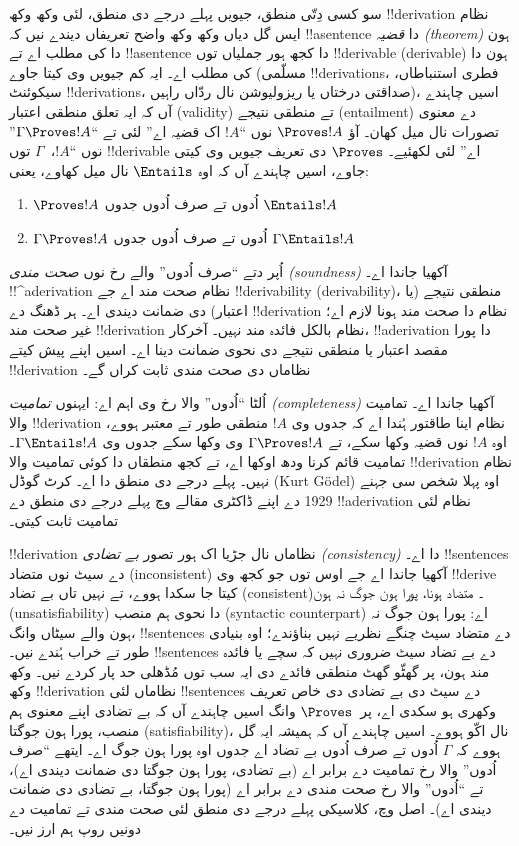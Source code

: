 \documentclass[../../../include/open-logic-section]{subfiles}
\begin{document}
سو کسی دِتّی منطق، جیویں پہلے درجے دی منطق، لئی وکھ وکھ
!!{derivation} نظام ایس گل دیاں وکھ وکھ واضح تعریفاں دیندے نیں کہ
!!a{sentence} دا \emph{قضیہ (theorem)} ہون دا کی مطلب اے تے !!a{sentence} دا
کجھ ہور جملیاں توں !!{derivable} (derivable) ہون دا کی مطلب اے۔ ایہ کم جیویں وی
کیتا جاوے (مسلّمی !!{derivation}s، فطری استنباطاں، سیکوئنٹ
!!{derivation}s، صداقتی درختاں یا ریزولیوشن نال ردّاں راہیں)، اسیں
چاہندے آں کہ ایہ تعلق منطقی اعتبار (validity) تے منطقی نتیجے
(entailment) دے معنوی تصورات نال
میل کھان۔ آؤ $\Proves !A$ نوں ``$!A$ اک قضیہ اے'' لئی تے
``$\Gamma \Proves !A$'' نوں ``$!A$،~$\Gamma$ توں !!{derivable} اے''
لئی لکھئیے۔ $\Proves$ دی تعریف جیویں وی کیتی جاوے، اسیں چاہندے آں کہ
اوہ $\Entails$ نال میل کھاوے، یعنی:
\begin{enumerate}
\item $\Proves !A$ اُدوں تے صرف اُدوں جدوں $\Entails !A$
\item $\Gamma \Proves !A$ اُدوں تے صرف اُدوں جدوں $\Gamma \Entails !A$
\end{enumerate}
اُپر دتے ``صرف اُدوں'' والے رخ نوں \emph{صحت مندی (soundness)} آکھیا جاندا اے۔
!!^a{derivation} نظام صحت مند اے جے !!{derivability} (derivability)، منطقی نتیجے (یا
اعتبار) دی ضمانت دیندی اے۔ ہر ڈھنگ دے !!{derivation} نظام دا صحت مند
ہونا لازم اے؛ غیر صحت مند !!{derivation} نظام بالکل فائدہ مند نہیں۔
آخرکار، !!a{derivation} دا پورا مقصد اعتبار یا منطقی نتیجے دی نحوی
ضمانت دینا اے۔ اسیں اپنے پیش کیتے !!{derivation} نظاماں دی صحت مندی
ثابت کراں گے۔

اُلٹا ``اُدوں'' والا رخ وی اہم اے: ایہنوں \emph{تمامیت (completeness)} آکھیا جاندا
اے۔ تمامیت والا !!{derivation} نظام اینا طاقتور ہُندا اے کہ جدوں وی $!A$
منطقی طور تے معتبر ہووے، اوہ $!A$ نوں قضیہ وکھا سکے، تے
$\Gamma \Proves !A$ وی وکھا سکے جدوں وی $\Gamma \Entails !A$۔ تمامیت
قائم کرنا ودھ اوکھا اے، تے کجھ منطقاں دا کوئی تمامیت والا !!{derivation} نظام
نہیں۔ پہلے درجے دی منطق دا اے۔ کرٹ گوڈل (Kurt Gödel) اوہ پہلا شخص سی جہنے 1929 دے
اپنے ڈاکٹری مقالے وچ پہلے درجے دی منطق دے !!a{derivation} نظام لئی
تمامیت ثابت کیتی۔

!!{derivation} نظاماں نال جڑیا اک ہور تصور \emph{بے تضادی (consistency)} دا اے۔
!!{sentence}s دے سیٹ نوں متضاد (inconsistent) آکھیا جاندا اے جے اوس توں
جو کجھ وی !!{derive} کیتا جا سکدا ہووے، تے نہیں تاں بے تضاد (consistent)۔
متضاد ہونا، پورا ہون جوگ نہ ہون (unsatisfiability) دا نحوی ہم منصب
(syntactic counterpart) اے: پورا ہون جوگ نہ ہون والے سیٹاں
وانگ، !!{sentence}s دے متضاد سیٹ چنگے نظریے نہیں بناؤندے؛ اوہ بنیادی
طور تے خراب ہُندے نیں۔ !!{sentence}s دے بے تضاد سیٹ ضروری نہیں کہ سچے
یا فائدہ مند ہون، پر گھٹّو گھٹ منطقی فائدے دی ایہ سب توں مُڈھلی حد
پار کردے نیں۔ وکھ وکھ !!{derivation} نظاماں لئی !!{sentence}s دے سیٹ
دی بے تضادی دی خاص تعریف وکھری ہو سکدی اے، پر~$\Proves$ وانگ اسیں
چاہندے آں کہ بے تضادی اپنے معنوی ہم منصب، پورا ہون جوگتا
(satisfiability)، نال اکّو
ہووے۔ اسیں چاہندے آں کہ ہمیشہ ایہ گل ہووے کہ $\Gamma$ اُدوں تے صرف
اُدوں بے تضاد اے جدوں اوہ پورا ہون جوگ اے۔ ایتھے ``صرف اُدوں'' والا
رخ تمامیت دے برابر اے (بے تضادی، پورا ہون جوگتا دی ضمانت دیندی اے)،
تے ``اُدوں'' والا رخ صحت مندی دے برابر اے (پورا ہون جوگتا، بے تضادی
دی ضمانت دیندی اے)۔ اصل وچ، کلاسیکی پہلے درجے دی منطق لئی صحت مندی
تے تمامیت دے دونیں روپ ہم ارز نیں۔
\end{document}
